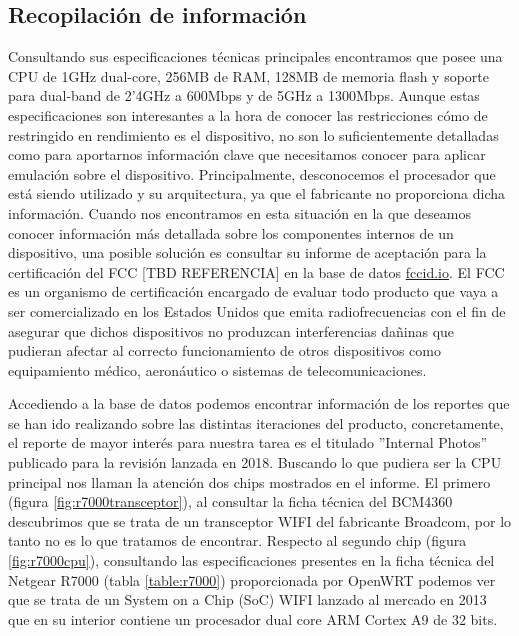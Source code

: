 \subsection{Recopilación de información}
Consultando sus especificaciones técnicas principales 
encontramos que posee una CPU de 1GHz dual-core, 256MB de RAM, 128MB de memoria flash y soporte para dual-band de 2'4GHz a 600Mbps y de 5GHz a 
1300Mbps. Aunque estas especificaciones son interesantes a la hora de conocer las restricciones cómo de restringido en rendimiento es el dispositivo,
no son lo suficientemente detalladas como para aportarnos información clave que necesitamos conocer para aplicar emulación sobre el dispositivo.
Principalmente, desconocemos el procesador que está siendo utilizado y su arquitectura, ya que el fabricante no proporciona dicha información.
Cuando nos encontramos en esta situación en la que deseamos conocer información más detallada sobre los componentes internos de un dispositivo, 
una posible solución es consultar su informe de aceptación para la certificación del FCC [TBD REFERENCIA] en la base de datos \hyperlink{fccid.io}{fccid.io}.
El FCC es un organismo de certificación encargado de evaluar todo producto que vaya a ser comercializado en los Estados Unidos que emita 
radiofrecuencias con el fin de asegurar que dichos dispositivos no produzcan interferencias dañinas que pudieran afectar al correcto
funcionamiento de otros dispositivos como equipamiento médico, aeronáutico o sistemas de telecomunicaciones.\bigskip

Accediendo a la base de datos podemos encontrar información de los reportes que se han ido realizando sobre las distintas iteraciones del producto,
concretamente, el reporte de mayor interés para nuestra tarea es el titulado ''Internal Photos'' publicado para la revisión lanzada en 2018\cite{netgearFCCid}.
Buscando lo que pudiera ser la CPU principal nos llaman la atención dos chips mostrados en el informe. El primero (figura \ref{fig:r7000transceptor}), al 
consultar la ficha técnica del BCM4360 descubrimos que se trata de un transceptor WIFI del fabricante Broadcom, por lo tanto no es lo que tratamos de 
encontrar. Respecto al segundo chip (figura \ref{fig:r7000cpu}), consultando las especificaciones presentes en la ficha técnica del Netgear R7000 
(tabla \ref{table:r7000}) proporcionada por OpenWRT podemos ver que se trata de un System on a Chip (SoC) WIFI lanzado al mercado en 2013\cite{broadcomSOCs} 
que en su interior contiene un procesador dual core ARM Cortex A9 de 32 bits.

